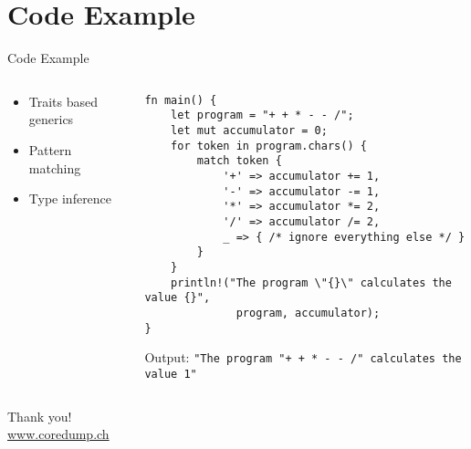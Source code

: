 \documentclass[aspectratio=1610,t]{beamer}
\begin{document}
\section{Code Example}

\begin{frame}[c,fragile]{Code Example}
  \begin{columns}
    \begin{column}{.3\textwidth}
      \centering
      \begin{itemize}
        \item Traits based generics
        \item Pattern matching
        \item Type inference
      \end{itemize}
    \end{column}

    \begin{column}{.8\textwidth}
    \begin{verbatim}
fn main() {
    let program = "+ + * - - /";
    let mut accumulator = 0;
    for token in program.chars() {
        match token {
            '+' => accumulator += 1,
            '-' => accumulator -= 1,
            '*' => accumulator *= 2,
            '/' => accumulator /= 2,
            _ => { /* ignore everything else */ }
        }
    }
    println!("The program \"{}\" calculates the value {}",
              program, accumulator);
}
  \end{verbatim}
      Output: \texttt{"The program "+ + * - - /" calculates the value 1"}
  \end{column}
  \end{columns}
\end{frame}




{
\begin{frame}[standout]
  \begin{centering}
    {\Huge Thank you!}\\
    {\normalsize \url{www.coredump.ch}}\\
  \end{centering}
\end{frame}
}
\end{document}
